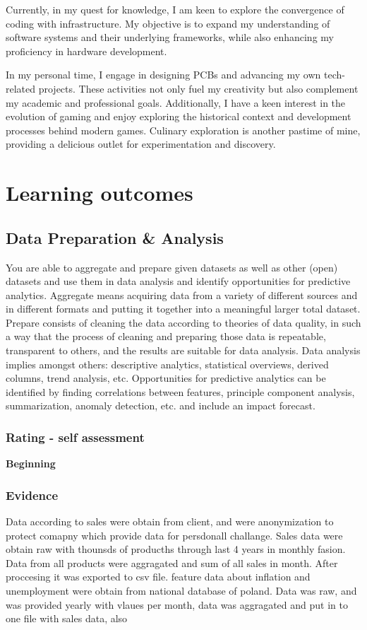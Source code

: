 \documentclass[a4paper, 11pt]{article}
\begin{document}
Currently, in my quest for knowledge, I am keen to explore the convergence of coding with infrastructure. My objective is to expand my understanding of software systems and their underlying frameworks, while also enhancing my proficiency in hardware development.
\medbreak

In my personal time, I engage in designing PCBs and advancing my own tech-related projects. These activities not only fuel my creativity but also complement my academic and professional goals. Additionally, I have a keen interest in the evolution of gaming and enjoy exploring the historical context and development processes behind modern games. Culinary exploration is another pastime of mine, providing a delicious outlet for experimentation and discovery.

\section{Learning outcomes}

\subsection{Data Preparation \& Analysis}
You are able to aggregate and prepare given datasets as well as other (open) datasets and use them in data analysis and identify opportunities for predictive analytics.   
\medbreak
Aggregate means acquiring data from a variety of different sources and in different formats and putting it together into a meaningful larger total dataset. Prepare consists of cleaning the data according to theories of data quality, in such a way that the process of cleaning and preparing those data is repeatable, transparent to others, and the results are suitable for data analysis. Data analysis implies amongst others: descriptive analytics, statistical overviews, derived columns, trend analysis, etc. Opportunities for predictive analytics can be identified by finding correlations between features, principle component analysis, summarization, anomaly detection, etc. and include an impact forecast.  

\subsubsection{Rating - self assessment}
\textbf{Beginning} 
\subsubsection{Evidence}
Data according to sales were obtain from client, and were anonymization to protect comapny which provide data for persdonall challange. Sales data were obtain raw with thounsds of producths through last 4 years in monthly fasion. Data from all products were aggragated and sum of all sales in month. After proccesing it was exported to csv file. 
feature data about inflation and unemployment were obtain from national database of poland. Data was raw, and was provided yearly with vlaues per month, data was aggragated and put in to one file with sales data, also 
\end{document}
